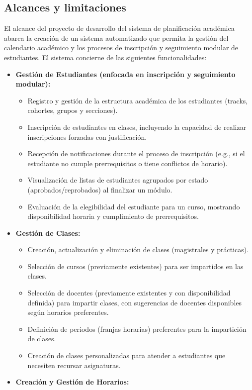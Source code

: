 \subsection{Alcances y limitaciones}
El alcance del proyecto de desarrollo del sistema de planificación académica abarca la creación de un sistema automatizado que permita la gestión del calendario académico y los procesos de inscripción y seguimiento modular de estudiantes.
El sistema concierne de las siguientes funcionalidades:

\begin{itemize}
\item \textbf{Gestión de Estudiantes (enfocada en inscripción y seguimiento modular):}
    \begin{itemize}
	\item Registro y gestión de la estructura académica de los estudiantes (tracks, cohortes, grupos y secciones).
	\item Inscripción de estudiantes en clases, incluyendo la capacidad de realizar inscripciones forzadas con justificación.
	\item Recepción de notificaciones durante el proceso de inscripción (e.g., si el estudiante no cumple prerrequisitos o tiene conflictos de horario).
	\item Visualización de listas de estudiantes agrupados por estado (aprobados/reprobados) al finalizar un módulo.
	\item Evaluación de la elegibilidad del estudiante para un curso, mostrando disponibilidad horaria y cumplimiento de prerrequisitos.
    \end{itemize}
\item \textbf{Gestión de Clases:}
    \begin{itemize}
	\item Creación, actualización y eliminación de clases (magistrales y prácticas).
	\item Selección de cursos (previamente existentes) para ser impartidos en las clases.
	\item Selección de docentes (previamente existentes y con disponibilidad definida) para impartir clases, con sugerencias de docentes disponibles según horarios preferentes.
	\item Definición de periodos (franjas horarias) preferentes para la impartición de clases.
	\item Creación de clases personalizadas para atender a estudiantes que necesiten recursar asignaturas.
    \end{itemize}
\item \textbf{Creación y Gestión de Horarios:}

\end{itemize}
